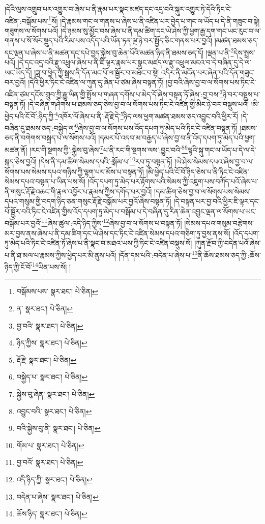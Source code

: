 །དེའི་ལུས་འགྲུབ་པར་འགྱུར་བ་ཞེས་པ་ནི་རྣམ་པར་སྣང་མཛད་དང་འདྲ་བའི་སྐུར་འགྱུར་ཏེ་དེའི་ཏིང་ངེ་འཛིན་:བསྒོམ་པས་\footnote{བསྒོམས་པས་  སྣར་ཐང་།  པེ་ཅིན། }སོ། །དེ་རྣམས་གང་ལ་གནས་པ་ཞེས་པ་ནི་འཛིན་པར་བྱེད་པ་གང་ལ་ཡོད་པ་དེ་ནི་གཟུང་བ་སྟེ། གཟུགས་ལ་སོགས་པའོ། །དེ་ཉམས་སུ་མྱོང་བས་ཞེས་པ་ནི་དམ་ཚིག་དང་ཡེ་ཤེས་ཀྱི་ཕྱག་རྒྱ་དག་གང་ཡང་རུང་བ་ལ་གནས་པ་སོ་སོར་སྡུད་པའི་རིམ་པས་འདོད་པའི་ཡོན་ཏན་ལྔ་ཉེ་བར་སྤྱོད་ཅིང་གནས་པར་བྱའོ། །མཚན་ཐམས་ཅད་དང་ལྡན་པ་ཞེས་པ་ནི་མཚན་དང་དཔེ་བྱད་སྐྱེས་བུ་ཆེན་པོའི་མཚན་ཉིད་ནི་ཐམས་ཅད་དོ། །ལྡན་པ་ནི་\footnote{ན་  སྣར་ཐང་།  པེ་ཅིན། }དེས་སྤྲས་པའོ། །དེ་དང་འདྲ་བའི་རྫུ་འཕྲུལ་ཞེས་པ་ནི་ཇི་ལྟར་རྣམ་པར་སྣང་མཛད་ལ་རྫུ་འཕྲུལ་མངའ་བ་དེ་བཞིན་དུ་དེ་ལ་ཡང་ཡོད་དོ། །ཟླ་བ་ཕྱེད་ཀྱི་སྒྲས་ནི་དོན་མང་པོ་ལ་སྦྱོར་བ་མཐོང་བ་སྟེ། འདིར་ནི་མངོན་པར་ཞེན་པའི་དོན་གཟུང་བར་བྱའོ། །དེའི་ཕྱིར་ཏིང་ངེ་འཛིན་ལ་ཀུན་དུ་ཞེན་པ་ཙམ་ཞེས་བསྟན་ཏོ། །བྱ་བའི་ཞེས་བྱ་བ་ལ་སོགས་པས་ཏིང་ངེ་འཛིན་ཙམ་དངོས་གྲུབ་ཀྱི་རྒྱུ་ཡིན་གྱི་སྤྲོས་པ་གཞན་དགོས་པ་མེད་དོ་ཞེས་བསྟན་ཏོ་ཞེས་:བྱ་བས་\footnote{བྱ་བའི་  སྣར་ཐང་།  པེ་ཅིན། }ཉེ་བར་བསྡུས་པ་བསྟན་ཏོ། །དེ་བཞིན་གཤེགས་པ་ཐམས་ཅད་ཅེས་བྱ་བ་ལ་སོགས་པས་ཏིང་ངེ་འཛིན་གྱི་མིང་ཉེ་བར་བསྡུས་པའོ། །མི་ཕྱེད་པའི་ངོ་བོ་:ཉིད་ཀྱི་\footnote{ཉིད་ཀྱིས་  སྣར་ཐང་།  པེ་ཅིན། }འཁོར་ལོ་ཞེས་པ་ནི་:རྡོ་རྗེ་དེ་\footnote{རྡོ་རྗེ་  སྣར་ཐང་།  པེ་ཅིན། }ཉིད་ལས་ཕྱག་མཚན་ཐམས་ཅད་འབྱུང་བའི་ཕྱིར་རོ། །དེ་བཞིན་དུ་ཐམས་ཅད་:བསྐྱེད་ལ་\footnote{བསྐྱེད་པ་  སྣར་ཐང་།  པེ་ཅིན། }ཞེས་བྱ་བ་ལ་སོགས་པས་འོད་དཔག་ཏུ་མེད་པའི་ཏིང་ངེ་འཛིན་བསྟན་ཏོ། །ཐམས་ཅད་ནི་བགེགས་བསྐྲད་པ་ལ་སོགས་པའོ། །དམར་པོ་འདབ་མ་བརྒྱད་པ་ཞེས་བྱ་བ་ནི་འོད་དཔག་ཏུ་མེད་པའི་ཕྱག་མཚན་ནོ། །རང་གི་སྔགས་ཀྱི་:སྐྱེས་བུ་ཞེས་\footnote{སྐྱེས་བུ་ཞེན་  སྣར་ཐང་།  པེ་ཅིན། }པ་ནི་རང་གི་སྔགས་ལས་:བྱུང་བའི་\footnote{འབྱུང་བའི་  སྣར་ཐང་།  པེ་ཅིན། }\footnote{བའི་སྐྱེས་བུ་ནི་  སྣར་ཐང་།  པེ་ཅིན། }ལྷའི་སྐུ་གང་ལ་ཡོད་པ་དེ་ལ་དེ་སྐད་ཅེས་བྱའོ། །དེས་ནི་དམ་ཚིག་སེམས་དཔའི་:སྒོམ་པ་\footnote{གོམ་པ་  སྣར་ཐང་།  པེ་ཅིན། }རབ་ཏུ་བསྟན་ཏོ། །ཡེ་ཤེས་སེམས་དཔའ་ཞེས་བྱ་བ་ལ་སོགས་པས་སེམས་དཔའ་གཉིས་ཀྱི་ལྷག་པར་མོས་པ་བསྟན་ཏོ། །མི་ཕྱེད་པའི་ངོ་བོ་ཉིད་ཅེས་པ་ནི་ཏིང་ངེ་འཛིན་སེམས་དཔའ་བསྟན་པ་ཡིན་པས་སོ། །འོད་དཔག་ཏུ་མེད་པར་རྟོགས་པའི་སེམས་ཀྱི་འཇུག་པས་བཀོད་པའོ་ཞེས་པ་ནི་གསུང་རྡོ་རྗེ་འཆང་གི་རྣལ་འབྱོར་པ་རྣམས་ཀྱིས་དགོད་པར་བྱའོ། །དམ་ཚིག་ཅེས་བྱ་བ་ལ་སོགས་པས་སེམས་དཔའ་གསུམ་གྱི་བདག་ཉིད་ཅན་གསུང་རྡོ་རྗེ་བསྒོམ་པར་བྱའོ་ཞེས་བསྟན་ཏོ། །དེ་བསྟན་པར་བྱ་བའི་ཕྱིར་ཇི་ལྟར་དང་པོ་སྦྱོར་བའི་ཏིང་ངེ་འཛིན་གྱིས་འོད་དཔག་ཏུ་མེད་པ་བསྒོམ་པ་དེ་བཞིན་དུ་རིན་ཆེན་འབྱུང་ལྡན་ལ་སོགས་པ་ཡང་བསྒོམ་པར་བྱའོ་\footnote{བྱ་བའོ་  སྣར་ཐང་།  པེ་ཅིན། }ཞེས་ཚུལ་:འདི་ཉིད་ཀྱིས་\footnote{འདི་ཉིད་ཀྱི་  སྣར་ཐང་།  པེ་ཅིན། }ཞེས་བྱ་བ་ལ་སོགས་པ་བསྟན་ཏོ། །སེམས་དཔའ་གསུམ་བརྩེགས་མར་བྱས་ནས་ཞེས་པ་ནི་དམ་ཚིག་དང་ཡེ་ཤེས་དང་ཏིང་ངེ་འཛིན་སེམས་དཔའ་གཅིག་ཏུ་བྱས་ནས་སོ། །འོད་དཔག་ཏུ་མེད་པའི་ཏིང་ངེ་འཛིན་ཏོ་ཞེས་པ་ནི་སྣང་བ་མཐའ་ཡས་ཀྱི་ཏིང་ངེ་འཛིན་བསྡུས་སོ། །ཀུན་རྫོབ་ཀྱི་བདེན་པའོ་ཞེས་པ་ནི་ཐ་མལ་པ་རྣམས་ཀྱིས་ཕྱེད་པར་མི་ནུས་པའོ། །དོན་དམ་པའི་:བདེན་པ་ཞེས་པ་\footnote{བདེན་པ་ཞེས་  སྣར་ཐང་།  པེ་ཅིན། }ནི་ཆོས་ཐམས་ཅད་ཀྱི་:ཆོས་ཉིད་ཀྱི་ངོ་བོ་\footnote{ཆོས་ཉིད་  སྣར་ཐང་།  པེ་ཅིན། }ཡིན་པས་སོ། །
